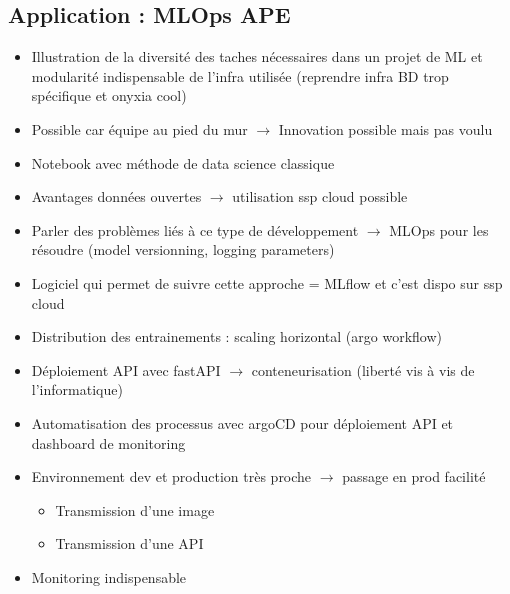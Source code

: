 \subsection{Application : MLOps APE}

\begin{itemize}
    \item Illustration de la diversité des taches nécessaires dans un projet de ML et modularité indispensable de l'infra utilisée (reprendre infra BD trop spécifique et onyxia cool)
    \item Possible car équipe au pied du mur $\rightarrow$ Innovation possible mais pas voulu
    \item Notebook avec méthode de data science classique
    \item Avantages données ouvertes $\rightarrow$ utilisation ssp cloud possible
    \item Parler des problèmes liés à ce type de développement $\rightarrow$ MLOps pour les résoudre (model versionning, logging parameters)
    \item Logiciel qui permet de suivre cette approche = MLflow et c'est dispo sur ssp cloud
    \item Distribution des entrainements : scaling horizontal (argo workflow)
    \item Déploiement API avec fastAPI $\rightarrow$ conteneurisation (liberté vis à vis de l'informatique)
    \item Automatisation des processus avec argoCD pour déploiement API et dashboard de monitoring
    \item Environnement dev et production très proche $\rightarrow$ passage en prod facilité
    \begin{itemize}
        \item Transmission d'une image
        \item Transmission d'une API
    \end{itemize}
    \item Monitoring indispensable
\end{itemize}

